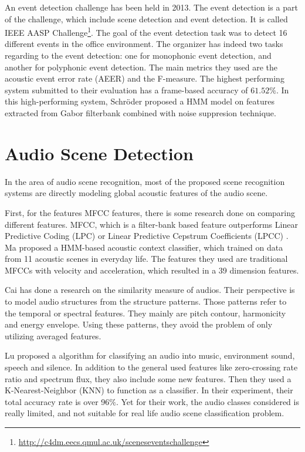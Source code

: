 An event detection challenge has been held in 2013. 
The event detection is a part of the challenge, which include scene detection and event detection.  
It is called IEEE AASP Challenge\footnote{\url{http://c4dm.eecs.qmul.ac.uk/sceneseventschallenge}}. 
The goal of the event detection task was to detect 16 different events in the office environment. 
The organizer has indeed two tasks regarding to the event detection: one for monophonic event detection, and another for polyphonic event detection.  
The main metrics they used are the acoustic event error rate (AEER) \cite{giannoulis2013ieee} and the F-measure.
The highest performing system submitted to their evaluation has a frame-based accuracy of $61.52\%$. 
In this high-performing system, Schr\"{o}der \et \cite{schroder2013acoustic} proposed a HMM model on features extracted from Gabor filterbank combined with noise suppresion technique. 

\section{Audio Scene Detection}
In the area of audio scene recognition, most of the proposed scene recognition systems are directly modeling global acoustic features of the audio scene. 

First, for the features MFCC features, there is some research done on comparing different features. 
MFCC, which is a filter-bank based feature outperforms Linear Predictive Coding (LPC) or Linear Predictive Cepstrum Coefficients (LPCC) \cite{levy2003comparison}. 
Ma \et \cite{ma2006acoustic} proposed a HMM-based acoustic context classifier, which trained on data from 11 acoustic scenes in everyday life. 
The features they used are traditional MFCCs with velocity and acceleration, which resulted in a 39 dimension features. 

Cai \et \cite{cai03usingstrcture} has done a research on the similarity measure of audios. 
Their perspective is to model audio structures from the structure patterns. 
Those patterns refer to the temporal or spectral features. 
They mainly are pitch contour, harmonicity and energy envelope. 
Using these patterns, they avoid the problem of only utilizing averaged features. 

Lu \et \cite{lu2001robust} proposed a algorithm for classifying an audio into music, environment sound, speech and silence. 
In addition to the general used features like zero-crossing rate ratio and spectrum flux, they also include some new features. 
Then they used a K-Nearest-Neighbor (KNN) to function as a classifier. 
In their experiment, their total accuracy rate is over 96$\%$. 
Yet for their work, the audio classes considered is really limited, and not suitable for real life audio scene classification problem.  

